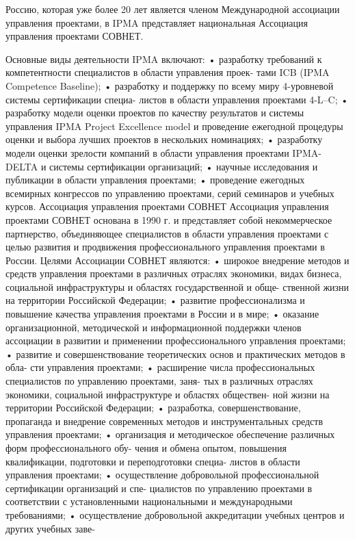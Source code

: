 Россию, которая уже более 20 лет является членом Международной ассоциации управления проектами, в IPMA представляет национальная Ассоциация управления проектами СОВНЕТ.

Основные виды деятельности IPMA включают:
• разработку требований к компетентности специалистов в области управления проек-
тами ICB (IPMA Competence Baseline);
• разработку и поддержку по всему миру 4-уровневой системы сертификации специа-
листов в области управления проектами 4-L–C;
• разработку модели оценки проектов по качеству результатов и системы управления
IPMA Project Excellence model и проведение ежегодной процедуры оценки и выбора лучших
проектов в нескольких номинациях;
• разработку модели оценки зрелости компаний в области управления проектами
IPMA-DELTA и системы сертификации организаций;
• научные исследования и публикации в области управления проектами;
• проведение ежегодных всемирных конгрессов по управлению проектами, серий
семинаров и учебных курсов.
Ассоциация управления проектами СОВНЕТ
Ассоциация управления проектами СОВНЕТ основана в 1990 г. и представляет собой
некоммерческое партнерство, объединяющее специалистов в области управления проектами
с целью развития и продвижения профессионального управления проектами в России.
Целями Ассоциации СОВНЕТ являются:
• широкое внедрение методов и средств управления проектами в различных отраслях
экономики, видах бизнеса, социальной инфраструктуры и областях государственной и обще-
ственной жизни на территории Российской Федерации;
• развитие профессионализма и повышение качества управления проектами в России
и в мире;
• оказание организационной, методической и информационной поддержки членов
ассоциации в развитии и применении профессионального управления проектами;
• развитие и совершенствование теоретических основ и практических методов в обла-
сти управления проектами;
• расширение числа профессиональных специалистов по управлению проектами, заня-
тых в различных отраслях экономики, социальной инфраструктуре и областях обществен-
ной жизни на территории Российской Федерации;
• разработка, совершенствование, пропаганда и внедрение современных методов и
инструментальных средств управления проектами;
• организация и методическое обеспечение различных форм профессионального обу-
чения и обмена опытом, повышения квалификации, подготовки и переподготовки специа-
листов в области управления проектами;
• осуществление добровольной профессиональной сертификации организаций и спе-
циалистов по управлению проектами в соответствии с установленными национальными и
международными требованиями;
• осуществление добровольной аккредитации учебных центров и других учебных заве-
